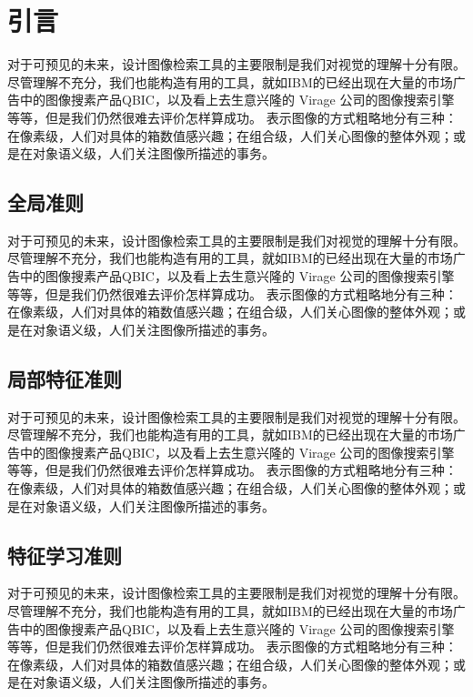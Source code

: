 \section{引言}

对于可预见的未来，设计图像检索工具的主要限制是我们对视觉的理解十分有限。尽管理解不充分，我们也能构造有用的工具，就如IBM的已经出现在大量的市场广告中的图像搜素产品QBIC，以及看上去生意兴隆的
Virage 公司的图像搜索引擎等等，但是我们仍然很难去评价怎样算成功。
表示图像的方式粗略地分有三种：在像素级，人们对具体的箱数值感兴趣；在组合级，人们关心图像的整体外观；或是在对象语义级，人们关注图像所描述的事务。

\subsection{全局准则}

对于可预见的未来，设计图像检索工具的主要限制是我们对视觉的理解十分有限。尽管理解不充分，我们也能构造有用的工具，就如IBM的已经出现在大量的市场广告中的图像搜素产品QBIC，以及看上去生意兴隆的
Virage 公司的图像搜索引擎等等，但是我们仍然很难去评价怎样算成功。
表示图像的方式粗略地分有三种：在像素级，人们对具体的箱数值感兴趣；在组合级，人们关心图像的整体外观；或是在对象语义级，人们关注图像所描述的事务。

\subsection{局部特征准则}

对于可预见的未来，设计图像检索工具的主要限制是我们对视觉的理解十分有限。尽管理解不充分，我们也能构造有用的工具，就如IBM的已经出现在大量的市场广告中的图像搜素产品QBIC，以及看上去生意兴隆的
Virage 公司的图像搜索引擎等等，但是我们仍然很难去评价怎样算成功。
表示图像的方式粗略地分有三种：在像素级，人们对具体的箱数值感兴趣；在组合级，人们关心图像的整体外观；或是在对象语义级，人们关注图像所描述的事务。

\subsection{特征学习准则}

对于可预见的未来，设计图像检索工具的主要限制是我们对视觉的理解十分有限。尽管理解不充分，我们也能构造有用的工具，就如IBM的已经出现在大量的市场广告中的图像搜素产品QBIC，以及看上去生意兴隆的
Virage 公司的图像搜索引擎等等，但是我们仍然很难去评价怎样算成功。
表示图像的方式粗略地分有三种：在像素级，人们对具体的箱数值感兴趣；在组合级，人们关心图像的整体外观；或是在对象语义级，人们关注图像所描述的事务。